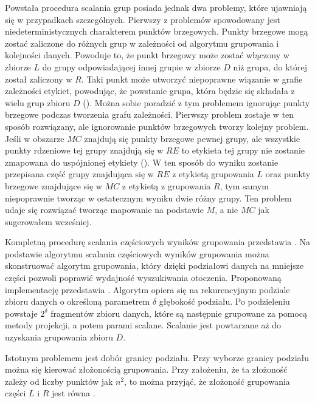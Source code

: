 Powstała procedura scalania grup posiada jednak dwa problemy, które ujawniają się w przypadkach szczególnych. Pierwszy z problemów spowodowany jest niedeterministycznych charakterem punktów brzegowych. Punkty brzegowe mogą zostać zaliczone do różnych grup w zależności od algorytmu grupowania i kolejności danych. Powoduje to, że punkt brzegowy może zostać włączony w zbiorze $ L $ do grupy odpowiadającej innej grupie w zbiorze $ D $ niż grupa, do której został zaliczony w $ R $. Taki punkt może utworzyć niepoprawne wiązanie w grafie zależności etykiet, powodując, że powstanie grupa, która będzie się składała z wielu grup zbioru $ D $ (). Można sobie poradzić z tym problemem ignorując punkty brzegowe podczas tworzenia grafu zależności. Pierwszy problem zostaje w ten sposób rozwiązany, ale ignorowanie punktów brzegowych tworzy kolejny problem. Jeśli w obszarze $ MC $ znajdują się punkty brzegowe pewnej grupy, ale wszystkie punkty rdzeniowe tej grupy znajdują się w $ RE $ to etykieta tej grupy nie zostanie zmapowana do uspójnionej etykiety (). W ten sposób do wyniku zostanie przepisana część grupy znajdująca się w $ RE $ z etykietą grupowania $ L $ oraz punkty brzegowe znajdujące się w $ MC $ z etykietą z grupowania $ R $, tym samym niepoprawnie tworząc w ostatecznym wyniku dwie różny grupy. Ten problem udaje się rozwiązać tworząc mapowanie na podstawie $ M $, a nie $ MC $ jak sugerowałem wcześniej.\par


Kompletną procedurę scalania częściowych wyników grupowania przedstawia . Na podstawie algorytmu scalania częściowych wyników grupowania można skonstruować algorytm grupowania, który dzięki podziałowi danych na mniejsze części pozwoli poprawić wydajność wyszukiwania otoczenia. Proponowaną implementację przedstawia . Algorytm opiera się na rekurencyjnym podziale zbioru danych o określoną parametrem $ \delta $ głębokość podziału. Po podzieleniu powstaje $ 2^\delta $ fragmentów zbioru danych, które są następnie grupowane za pomocą metody projekcji, a potem parami scalane. Scalanie jest powtarzane aż do uzyskania grupowania zbioru $ D $.\par

Istotnym problemem jest dobór granicy podziału. Przy wyborze granicy podziału można się kierować złożonością grupowania. Przy założeniu, że ta złożoność zależy od liczby punktów jak $ n^2 $, to można przyjąć, że złożoność grupowania części $ L $ i $ R $ jest równa .
